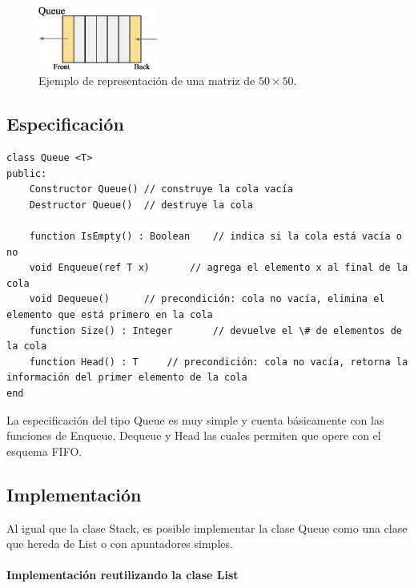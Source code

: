 \begin{figure}[htp!]
  \begin{center}
    \includegraphics[width=0.35\textwidth]{images/queue.eps}
  \end{center}
  \caption{Ejemplo de representación de una matriz de $50 \times 50$.}
  \label{fig:queue}
\end{figure}

\subsection{Especificación}

\begin{lstlisting}[upquote=true, language=pseudo]
class Queue <T>
public:
    Constructor Queue()	// construye la cola vacía
    Destructor Queue()	// destruye la cola

    function IsEmpty() : Boolean	// indica si la cola está vacía o no
    void Enqueue(ref T x)		// agrega el elemento x al final de la cola
    void Dequeue()		// precondición: cola no vacía, elimina el elemento que está primero en la cola
    function Size() : Integer		// devuelve el \# de elementos de la cola
    function Head() : T		// precondición: cola no vacía, retorna la información del primer elemento de la cola
end
\end{lstlisting}

La especificación del tipo Queue es muy simple y cuenta básicamente con las funciones de Enqueue, Dequeue y Head las cuales permiten que opere con el esquema FIFO.

\subsection{Implementación}

Al igual que la clase Stack, es posible implementar la clase Queue como una clase que hereda de List o con apuntadores simples.

\paragraph{Implementación reutilizando la clase List}

